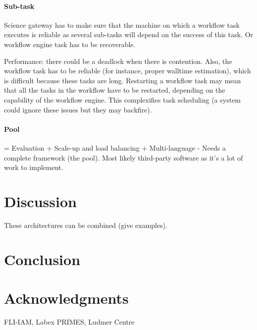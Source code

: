 \documentclass[preprint,3p,twocolumn]{elsarticle}
\begin{document}
\paragraph{Sub-task}

Science gateway has to make sure that the machine on which a workflow
task executes is reliable as several sub-tasks will depend on the
success of this task. Or workflow engine task has to be recoverable.

Performance: there could be a deadlock when there is contention. Also,
the workflow task has to be reliable (for instance, proper walltime
estimation), which is difficult because these tasks are
long. Restarting a workflow task may mean that all the tasks in the
workflow have to be restarted, depending on the capability of the
workflow engine. This complexifies task scheduling (a system could
ignore these issues but they may backfire).


\paragraph{Pool}

= Evaluation
+ Scale-up and load balancing
+ Multi-language
- Needs a complete framework (the pool). Most likely third-party software as it's a lot of work to implement.


\section{Discussion}

These architectures can be combined (give examples). 

\section{Conclusion}

\section{Acknowledgments}

FLI-IAM, Labex PRIMES, Ludmer Centre

 

\end{document}
